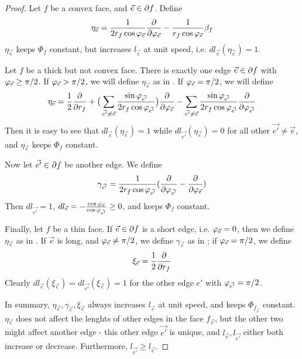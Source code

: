 \begin{proof}
Let $f$ be a convex face, and $\vec{e} \in \partial f$. Define
\begin{equation}
\label{e:eta_e}
\eta_{\vec{e}} =
\frac{1}{2 r_f \cos \varphi_{\vec{e}}} {\frac{\partial}{\partial \varphi_{\vec{e}}}}
- \frac{1}{r_f \cos \varphi_{\vec{e}}} \beta_f
\end{equation}
$\eta_{\vec{e}}$ keeps $\Phi_f$ constant, but increases $l_{\vec{e}}$
at unit speed, i.e. $dl_{\vec{e}}(\eta_{\vec{e}}) = 1$.


Let $f$ be a thick but not convex face.
There is exactly one edge $\vec{e} \in \partial f$
with $\varphi_{\vec{e}} \geq \pi/2$.
If $\varphi_{\vec{e}} > \pi/2$, we will define
$\eta_{\vec{e}}$ as in .
If $\varphi_{\vec{e}} = \pi/2$,
we will define
\begin{equation}
\label{e:eta_e_2}
\eta_{\vec{e}} = \frac{1}{2}{\frac{\partial}{\partial r_f}}
+ \big(\sum_{\vec{e'} \neq \vec{e}}
	\frac{\sin \varphi_{\vec{e'}}}{2 r_f \cos \varphi_{\vec{e'}}}\big)
	{\frac{\partial}{\partial \varphi_{\vec{e}}}}
- \sum_{\vec{e'} \neq \vec{e}}
	\frac{\sin \varphi_{\vec{e'}}}{2 r_f \cos \varphi_{\vec{e'}}}
	{\frac{\partial}{\partial \varphi_{\vec{e'}}}}
\end{equation}
Then it is easy to see that
$dl_{\vec{e}}(\eta_{\vec{e}}) = 1$
while
$dl_{\vec{e'}}(\eta_{\vec{e}}) = 0$
for all other $\vec{e'} \neq \vec{e}$,
and $\eta_{\vec{e}}$ keeps $\Phi_f$ constant.


Now let $\vec{e'} \in \partial f$ be another edge.
We define
\begin{equation}
\label{e:gamma_e}
\gamma_{\vec{e'}} = \frac{1}{2 r_f \cos{\varphi_{\vec{e'}}}}
	({\frac{\partial}{\partial \varphi_{\vec{e'}}}} - {\frac{\partial}{\partial \varphi_{\vec{e}}}})
\end{equation}
Then $dl_{\vec{e'}} = 1$,
$dl_{\vec{e}} = -\frac{\cos \varphi_{\vec{e}}}{\cos \varphi_{\vec{e'}}} \geq 0$,
and keeps $\Phi_f$ constant.


Finally, let $f$ be a thin face.
If $\vec{e} \in \partial f$ is a short edge,
i.e. $\varphi_{\vec{e}} = 0$,
then we define $\eta_{\vec{e}}$ as in .
If $\vec{e}$ is long, and $\varphi_{\vec{e}} \neq \pi/2$,
we define $\gamma_{\vec{e}}$ as in ;
if $\varphi_{\vec{e}} = \pi/2$, we define
\begin{equation}
\label{e:xi_e}
\xi_{\vec{e}} = \frac{1}{2}{\frac{\partial}{\partial r_f}}
\end{equation}
Clearly $dl_{\vec{e}}(\xi_{\vec{e}}) = dl_{\vec{e'}}(\xi_{\vec{e}}) = 1$
for the other edge $e'$ with $\varphi_{\vec{e'}} = \pi/2$.


In summary,
$\eta_{\vec{e}}, \gamma_{\vec{e}}, \xi_{\vec{e}}$
always increases $l_{\vec{e}}$ at unit speed,
and keeps $\Phi_{f_{\vec{e}}}$ constant.
$\eta_{\vec{e}}$ does not affect the lenghts of other edges
in the face $f_{\vec{e}}$,
but the other two might affect another edge
- this other edge $\vec{e'}$ is unique,
and $l_{\vec{e}}, l_{\vec{e'}}$ either both increase
or decrease.
Furthermore, $l_{\vec{e'}} \geq l_{\vec{e}}$.



\end{proof}
